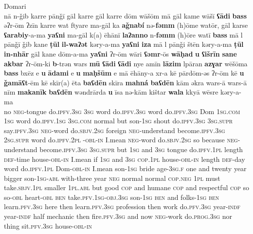 \documentclass[output=paper]{langsci/langscibook}
\begin{document}
\ea
{ Domari}\\ \label{speech}
\gll nā n-ǧib karre pānǧī gāl karre gāl karre dōm wāšōm mā gāl kame wāšī \textbf{ʕādi} \textbf{bass} əʔr-ōm ʔzīn karre wat ftyare ma-gāl ka \textbf{aǧnabí} nə-\textbf{fəmm} (h)ōme watōr, gāl karse \textbf{ʕarabiy}{}-a-ma \textbf{yaʕni} ma-gāl k(a) ēhānī \textbf{laʔanno} n-\textbf{fəmm} (h)ōre watī \textbf{bass} mā l pānǧī ǧib kane \textbf{ṭūl} \textbf{il-waʔət} kəry-a-ma \textbf{yaʕni} \textbf{iza} mā l pānǧi štēn kəry-a-ma \textbf{ṭūl} \textbf{in-nhār} gāl kane dōm-a-ma \textbf{yaʕni} ʔr-ōm wāri \textbf{ʕəmr}-ōs \textbf{wāḥad} \textbf{u} \textbf{ʕišrīn} \textbf{sane} \textbf{akbar} ʔr-ōm-ki \textbf{b}{}-trən wars  \textbf{mū} \textbf{ʕādi} \textbf{ʕādi} nye amīn \textbf{lāzim} lpāran \textbf{azɣar} wēšōma \textbf{bass} bxēz e \textbf{u} \textbf{ādami} e \textbf{u} \textbf{maḥšūm} e mā ēhāny-a xr-a kē pārdōm-əs ʔr-ōm kē \textbf{u} \textbf{ǧamāʕt}-ēm kē skīr(a) ēta \textbf{baʕdēn} skīra \textbf{mahná} \textbf{baʕdēn} kām əkra wars-ā wars-ā nīm \textbf{makanīk} \textbf{baʕdēn} wəndrārda \textbf{u} īsa nə-kām kištar \textbf{wala} kkyā wēsre kəry-a-ma\\
no \textsc{neg}{}-tongue do\textsc{.ipfv.3sg} \textsc{3sg} word do.\textsc{ipfv.3sg} word do\textsc{.ipfv.3sg} Dom \textsc{1sg.com} \textsc{1sg} word do.\textsc{ipfv.1sg} \textsc{3sg.com} normal but son-\textsc{1sg} shout do\textsc{.ipfv.3sg} \textsc{3sg.supr} say.\textsc{ipfv.3sg} \textsc{neg}{}-word do.\textsc{sbjv.2sg} foreign \textsc{neg}{}-understand become.\textsc{ipfv.3sg} \textsc{2sg.supr} word do.\textsc{ipfv.2pl} -\textsc{obl-in} I.mean \textsc{neg}{}-word do.\textsc{sbjv.2sg} so because \textsc{neg}{}-understand become.\textsc{ipfv.3sg} \textsc{3sg.supr} but \textsc{1sg} and \textsc{3sg} tongue do.\textsc{ipfv.1pl} length \textsc{def}{}-time house-\textsc{obl-in} I.mean if \textsc{1sg} and \textsc{3sg} \textsc{cop.1pl} house-\textsc{obl-in} length \textsc{def}{}-day word do\textsc{.ipfv.1pl} Dom-\textsc{obl-in} I.mean son-\textsc{1sg} bride age-\textsc{3sg.f} one and twenty year bigger son-\textsc{1sg-abl} with-three year \textsc{neg} normal normal \textsc{cop.neg} \textsc{1pl} must take\textsc{.sbjv.1pl} smaller \textsc{1pl.abl} but good \textsc{cop} and humane \textsc{cop} and respectful \textsc{cop} so so-\textsc{obl} heart-\textsc{obl} \textsc{ben} take.\textsc{pfv}.\textsc{1sg-obj.3sg} son-\textsc{1sg} \textsc{ben} and folks-\textsc{1sg} \textsc{ben} learn.\textsc{pfv.3sg} here then learn.\textsc{pfv.3sg} profession then work do.\textsc{pfv.3sg} year-\textsc{indf} year-\textsc{indf} half mechanic then fire.\textsc{pfv.3sg} and now \textsc{neg}-work do.\textsc{prog.3sg} nor thing sit.\textsc{pfv.3sg} house-\textsc{obl-in}\\
\end{document}
